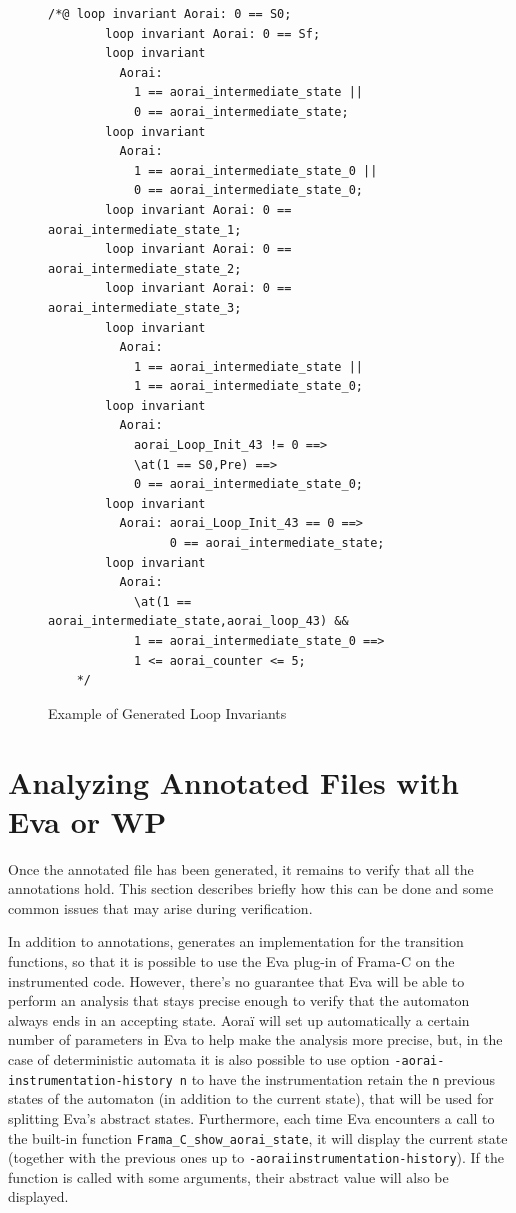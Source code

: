 \documentclass{report}
\begin{document}
\begin{figure}
\begin{lstlisting}[language=ACSL]
   /*@ loop invariant Aorai: 0 == S0;
        loop invariant Aorai: 0 == Sf;
        loop invariant
          Aorai:
            1 == aorai_intermediate_state ||
            0 == aorai_intermediate_state;
        loop invariant
          Aorai:
            1 == aorai_intermediate_state_0 ||
            0 == aorai_intermediate_state_0;
        loop invariant Aorai: 0 == aorai_intermediate_state_1;
        loop invariant Aorai: 0 == aorai_intermediate_state_2;
        loop invariant Aorai: 0 == aorai_intermediate_state_3;
        loop invariant
          Aorai:
            1 == aorai_intermediate_state ||
            1 == aorai_intermediate_state_0;
        loop invariant
          Aorai:
            aorai_Loop_Init_43 != 0 ==>
            \at(1 == S0,Pre) ==>
            0 == aorai_intermediate_state_0;
        loop invariant
          Aorai: aorai_Loop_Init_43 == 0 ==>
                 0 == aorai_intermediate_state;
        loop invariant
          Aorai:
            \at(1 == aorai_intermediate_state,aorai_loop_43) &&
            1 == aorai_intermediate_state_0 ==>
            1 <= aorai_counter <= 5;
    */
\end{lstlisting}
  \caption{Example of Generated Loop Invariants}
  \label{FigGeneratedLoopInvariants}
\end{figure}

\section{Analyzing Annotated Files with Eva or WP}
\label{collaboration}
Once the annotated file has been generated, it remains to verify that all the
annotations hold. This section describes briefly how this can be done and some
common issues that may arise during verification.

In addition to annotations, \aorai generates an implementation for the transition
functions, so that it is possible to use the Eva plug-in of Frama-C on the
instrumented code. However, there's no guarantee that Eva will be able to
perform an analysis that stays precise enough to verify that the automaton
always ends in an accepting state. Aoraï will set up automatically a certain number
of parameters in Eva to help make the analysis more precise, but,
in the case of deterministic automata it is also possible
to use option \texttt{-aorai-instrumentation-history n} to have the instrumentation
retain the \texttt{n} previous states of the automaton (in addition to the
current state), that will be used for splitting Eva's abstract states. Furthermore,
each time Eva encounters a call to the 
built-in function \texttt{Frama\_C\_show\_aorai\_state}, it will display the current
state (together with the previous ones up to \texttt{-aorai\-instrumentation-history}).
If the function is called with some arguments, their abstract value will also be
displayed.
\end{document}
